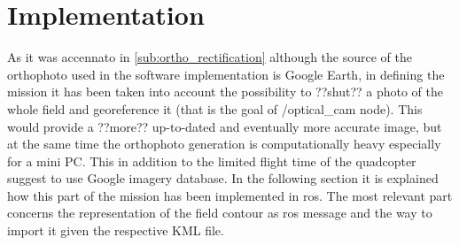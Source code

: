 \section{Implementation} %
\label{sec:implementation}
As it was accennato in \ref{sub:ortho_rectification} although the source of the orthophoto used in the software implementation is Google Earth, in defining the mission it has been taken into account the possibility to ??shut?? a photo of the whole field and georeference it (that is the goal of \textsf{/optical\_cam} node). This would provide a ??more?? up-to-dated and eventually more accurate image, but at the same time the orthophoto generation is computationally heavy especially for a mini PC. This in addition to the limited flight time of the quadcopter suggest to use Google imagery database.
In the following section it is explained how this part of the mission has been implemented in \acrshort{ros}. The most relevant part concerns the representation of the field contour as \acrshort{ros} message and the way to import it given the respective KML file.

